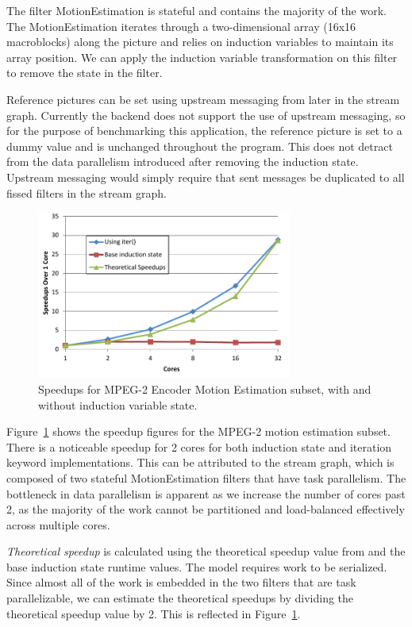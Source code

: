 The filter MotionEstimation is stateful and contains the majority of the work.  The MotionEstimation iterates through a two-dimensional array (16x16 macroblocks) along the picture and relies on induction variables to maintain its array position.  We can apply the induction variable transformation on this filter to remove the state in the filter.

Reference pictures can be set using upstream messaging from later in the stream graph.  Currently the backend does not support the use of upstream messaging, so for the purpose of benchmarking this application, the reference picture is set to a dummy value and is unchanged throughout the program.  This does not detract from the data parallelism introduced after removing the induction state.  Upstream messaging would simply require that sent messages be duplicated to all fissed filters in the stream graph.

\begin{figure}[t]
\includegraphics[width=3.3in]{figures/mpeg-results.pdf}
\caption{Speedups for MPEG-2 Encoder Motion Estimation subset, with and without induction variable state.  \protect\label{fig:mpeg-results}}
\end{figure}

Figure~\ref{fig:mpeg-results} shows the speedup figures for the MPEG-2 motion estimation subset.  There is a noticeable speedup for 2 cores for both induction state and iteration keyword implementations.  This can be attributed to the stream graph, which is composed of two stateful MotionEstimation filters that have task parallelism.  The bottleneck in data parallelism is apparent as we increase the number of cores past 2, as the majority of the work cannot be partitioned and load-balanced effectively across multiple cores.  

{\it Theoretical speedup} is calculated using the theoretical speedup value from \label{sec:model-analysis} and the base induction state runtime values.  The model requires work to be serialized.  Since almost all of the work is embedded in the two filters that are task parallelizable, we can estimate the theoretical speedups by dividing the theoretical speedup value by 2.  This is reflected in Figure~\ref{fig:mpeg-results}.

